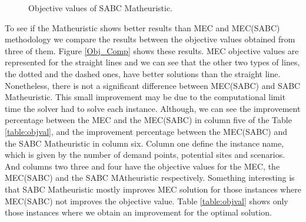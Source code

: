 \begin{figure}[H]
\hspace{0.4cm}%
\vspace{0.4cm}
\caption{Objective values of SABC Matheuristic.}
\label{Obj_Math}
\end{figure}


To see if the Matheuristic shows better results than MEC and MEC(SABC) methodology we compare the results between the objective values obtained from three of them. Figure \ref{Obj_Comp} shows these results. MEC objective values are represented for the straight lines and we can see that the other two types of lines, the dotted and the dashed ones, have better solutions than the straight line. Nonetheless, there is not a significant difference between MEC(SABC) and SABC Matheuristic. This small improvement may be due to the computational limit time the solver had to solve each instance. Although, we can see the improvement percentage between the MEC and the MEC(SABC) in column five of the Table \ref{table:objval}, and the improvement percentage between the MEC(SABC) and the SABC Matheuristic in column six. Column one define the instance name, which is given by the number of demand points, potential sites and scenarios. And columns two three and four have the objective values for the MEC, the MEC(SABC) and the SABC MAtheuristic respectively. Something interesting is that SABC Matheuristic mostly improves MEC solution for those instances where MEC(SABC) not improves the objective value. Table \ref{table:objval} shows only those instances where we obtain an improvement for the optimal solution. 



